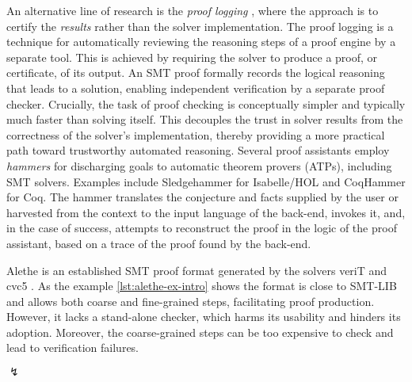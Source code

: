 An alternative line of research is the \emph{proof logging} \cite{proof-logging}, where the approach is to certify the \emph{results} rather than the solver implementation.
The proof logging is a technique for automatically reviewing the reasoning steps of a proof engine by a separate tool.
This is achieved by requiring the solver to produce a proof, or certificate, of its output.
An SMT proof formally records the logical reasoning that leads to a solution, enabling independent verification by a separate proof checker.
Crucially, the task of proof checking is conceptually simpler and typically much faster than solving itself.
This decouples the trust in solver results from the correctness of the solver’s implementation, thereby providing a more practical path toward trustworthy automated reasoning.
Several proof assistants employ \emph{hammers} for discharging goals to automatic theorem provers (ATPs), including SMT solvers.
Examples include Sledgehammer \cite{Sledgehammer} for Isabelle/HOL and CoqHammer \cite{coqhammer1,coqhammer2} for Coq.
The hammer translates the conjecture and facts supplied by the user or harvested from the context to the input language of the back-end, invokes it, and, in the case of success, attempts to reconstruct the proof in the logic of the proof assistant, based on a trace of the proof found by the back-end.

Alethe is an established SMT proof format generated by the solvers veriT \cite{verit} and cvc5 \cite{cvc5}.
As the example \cref{lst:alethe-ex-intro} shows the format is close to SMT-LIB and allows both coarse and fine-grained steps, facilitating proof production.
However, it lacks a stand-alone checker, which harms its usability and hinders its adoption. 
Moreover, the coarse-grained steps can be too expensive to check and lead to verification failures.


\begin{center}
$\lightning$
\end{center}



